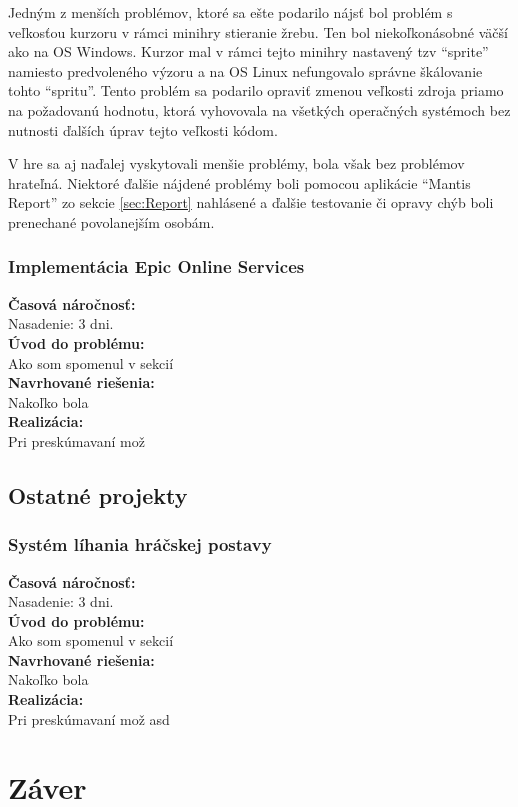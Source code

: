 \documentclass[slovak, bachelorpractice]{diploma}
\begin{document}
Jedným z menších problémov, ktoré sa ešte podarilo nájsť bol problém s veľkosťou kurzoru v rámci minihry stieranie žrebu. Ten bol niekoľkonásobné väčší ako na OS Windows. Kurzor mal v rámci tejto minihry nastavený tzv \enquote{sprite} namiesto predvoleného výzoru a na OS Linux nefungovalo správne škálovanie tohto \enquote{spritu}. Tento problém sa podarilo opraviť zmenou veľkosti zdroja priamo na požadovanú hodnotu, ktorá vyhovovala na všetkých operačných systémoch bez nutnosti ďalších úprav tejto veľkosti kódom.

V hre sa aj naďalej vyskytovali menšie problémy, bola však bez problémov hrateľná. Niektoré ďalšie nájdené problémy boli pomocou aplikácie \enquote{Mantis Report} zo sekcie \ref{sec:Report} nahlásené a ďalšie testovanie či opravy chýb boli prenechané povolanejším osobám.

\subsection{Implementácia Epic Online Services}
\label{sec:implEOS}
\textbf{Časová náročnosť:} \\ Nasadenie: 3 dni.\\
\textbf{Úvod do problému:} \\ Ako som spomenul v sekcií \\
\textbf{Navrhované riešenia:} \\ Nakoľko bola \\
\textbf{Realizácia:} \\ Pri preskúmavaní mož

\section{Ostatné projekty}
\label{sec:Others}
\subsection{Systém líhania hráčskej postavy}
\label{sec:sleep}
\textbf{Časová náročnosť:} \\ Nasadenie: 3 dni.\\
\textbf{Úvod do problému:} \\ Ako som spomenul v sekcií \\
\textbf{Navrhované riešenia:} \\ Nakoľko bola \\
\textbf{Realizácia:} \\ Pri preskúmavaní mož
asd
\chapter{Záver}
\end{document}
